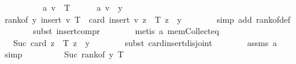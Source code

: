 \begin{isabellebody}
\ \ \isamarkupfalse%
\ {\isacharminus}{\kern0pt}\isanewline
\ \ \ \ \isamarkupfalse%
\ a{\isacharunderscore}{\kern0pt}{}{\isacharcolon}{\kern0pt}\ {\isachardoublequoteopen}v\ {\isasymnotin}\ T{\isachardoublequoteclose}\isanewline
\ \ \ \ \isamarkupfalse%
\ a{\isacharunderscore}{\kern0pt}{}{\isacharcolon}{\kern0pt}\ {\isachardoublequoteopen}v\ {\isacharless}{\kern0pt}\ y{\isachardoublequoteclose}\isanewline
\ \ \ \ \isamarkupfalse%
\ {\isachardoublequoteopen}rank{\isacharunderscore}{\kern0pt}of\ y\ {\isacharparenleft}{\kern0pt}insert\ v\ T{\isacharparenright}{\kern0pt}\ {\isacharequal}{\kern0pt}\ card\ {\isacharparenleft}{\kern0pt}insert\ v\ {\isacharbraceleft}{\kern0pt}z\ {\isasymin}\ T{\isachardot}{\kern0pt}\ z\ {\isacharless}{\kern0pt}\ y{\isacharbraceright}{\kern0pt}{\isacharparenright}{\kern0pt}{\isachardoublequoteclose}\isanewline
\ \ \ \ \ \ \isamarkupfalse%
\ {\isacharparenleft}{\kern0pt}simp\ add{\isacharcolon}{\kern0pt}\ rank{\isacharunderscore}{\kern0pt}of{\isacharunderscore}{\kern0pt}def{\isacharparenright}{\kern0pt}\ \isanewline
\ \ \ \ \ \ \isamarkupfalse%
\ {\isacharparenleft}{\kern0pt}subst\ insert{\isacharunderscore}{\kern0pt}compr{\isacharparenright}{\kern0pt}\isanewline
\ \ \ \ \ \ \isamarkupfalse%
\ {\isacharparenleft}{\kern0pt}metis\ a{\isacharunderscore}{\kern0pt}{}\ mem{\isacharunderscore}{\kern0pt}Collect{\isacharunderscore}{\kern0pt}eq{\isacharparenright}{\kern0pt}\isanewline
\ \ \ \ \isamarkupfalse%
\ \isamarkupfalse%
\ {\isachardoublequoteopen}{\isachardot}{\kern0pt}{\isachardot}{\kern0pt}{\isachardot}{\kern0pt}\ {\isacharequal}{\kern0pt}\ Suc\ {\isacharparenleft}{\kern0pt}card\ {\isacharbraceleft}{\kern0pt}z\ {\isasymin}\ T{\isachardot}{\kern0pt}\ z\ {\isacharless}{\kern0pt}\ y{\isacharbraceright}{\kern0pt}{\isacharparenright}{\kern0pt}{\isachardoublequoteclose}\isanewline
\ \ \ \ \ \ \isamarkupfalse%
\ {\isacharparenleft}{\kern0pt}subst\ card{\isacharunderscore}{\kern0pt}insert{\isacharunderscore}{\kern0pt}disjoint{\isacharparenright}{\kern0pt}\isanewline
\ \ \ \ \ \ \isamarkupfalse%
\ assms\ a{\isacharunderscore}{\kern0pt}{}\ \isamarkupfalse%
\ simp{\isacharplus}{\kern0pt}\isanewline
\ \ \ \ \isamarkupfalse%
\ \isamarkupfalse%
\ {\isachardoublequoteopen}{\isachardot}{\kern0pt}{\isachardot}{\kern0pt}{\isachardot}{\kern0pt}\ {\isacharequal}{\kern0pt}\ Suc\ {\isacharparenleft}{\kern0pt}rank{\isacharunderscore}{\kern0pt}of\ y\ T{\isacharparenright}{\kern0pt}{\isachardoublequoteclose}\isanewline

\end{isabellebody}
